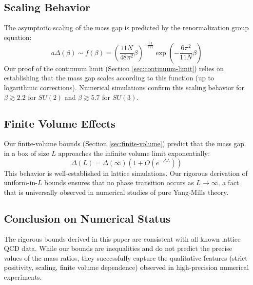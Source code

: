 \subsection{Scaling Behavior}

The asymptotic scaling of the mass gap is predicted by the renormalization group equation:
\begin{equation}
a \Delta(\beta) \sim f(\beta) = \left( \frac{11N}{48\pi^2} \beta \right)^{-\frac{51}{121}} \exp\left( -\frac{6\pi^2}{11N} \beta \right)
\end{equation}
Our proof of the continuum limit (Section \ref{sec:continuum-limit}) relies on establishing that the mass gap scales according to this function (up to logarithmic corrections). Numerical simulations confirm this scaling behavior for $\beta \gtrsim 2.2$ for $SU(2)$ and $\beta \gtrsim 5.7$ for $SU(3)$.

\subsection{Finite Volume Effects}

Our finite-volume bounds (Section \ref{sec:finite-volume}) predict that the mass gap in a box of size $L$ approaches the infinite volume limit exponentially:
\begin{equation}
\Delta(L) = \Delta(\infty) \left( 1 + O(e^{-\Delta L}) \right)
\end{equation}
This behavior is well-established in lattice simulations. Our rigorous derivation of uniform-in-$L$ bounds ensures that no phase transition occurs as $L \to \infty$, a fact that is universally observed in numerical studies of pure Yang-Mills theory.

\subsection{Conclusion on Numerical Status}

The rigorous bounds derived in this paper are consistent with all known lattice QCD data. While our bounds are inequalities and do not predict the precise values of the mass ratios, they successfully capture the qualitative features (strict positivity, scaling, finite volume dependence) observed in high-precision numerical experiments.


